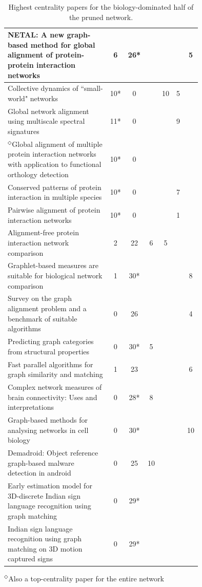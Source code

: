 \documentclass[12pt]{thesis}
\theoremstyle{plain}
\theoremstyle{definition}
\theoremstyle{remark}
\begin{document}
\begin{table}[H]
{\begin{tabular}{|L{0.75\linewidth}|c|c|c|c|c|c|}
NETAL: A new graph-based method for global alignment of protein-protein interaction networks  \cite{Neyshabur_2013} & 6 & 26* &  &  &  & 5 \\ \hline
Collective dynamics of ``small-world" networks  \cite{Watts_1998} & 10* & 0 &  & 10 & 5 &  \\ \hline
Global network alignment using multiscale spectral signatures  \cite{Patro_2012} & 11* & 0 &  &  & 9 &  \\ \hline
$^\Diamond$Global alignment of multiple protein interaction networks with application to functional orthology detection  \cite{Singh_2008} & 10* & 0 &  &  &  &  \\ \hline
Conserved patterns of protein interaction in multiple species  \cite{Sharan_2005} & 10* & 0 &  &  & 7 &  \\ \hline
Pairwise alignment of protein interaction networks  \cite{Koyuturk_2006} & 10* & 0 &  &  & 1 &  \\ \hline
Alignment-free protein interaction network comparison  \cite{Ali_2014} & 2 & 22 & 6 & 5 &  &  \\ \hline
Graphlet-based measures are suitable for biological network comparison  \cite{Hayes_2013} & 1 & 30* &  &  &  & 8 \\ \hline
Survey on the graph alignment problem and a benchmark of suitable algorithms  \cite{Dopmann_2013} & 0 & 26 &  &  &  & 4 \\ \hline
Predicting graph categories from structural properties  \cite{Canning_2018} & 0 & 30* & 5 &  &  &  \\ \hline
Fast parallel algorithms for graph similarity and matching  \cite{Kollias_2014} & 1 & 23 &  &  &  & 6 \\ \hline
Complex network measures of brain connectivity: Uses and interpretations  \cite{Rubinov_2010} & 0 & 28* & 8 &  &  &  \\ \hline
Graph-based methods for analysing networks in cell biology  \cite{Aittokallio_2006} & 0 & 30* &  &  &  & 10 \\ \hline
Demadroid: Object reference graph-based malware detection in android  \cite{Wang_2018} & 0 & 25 & 10 &  &  &  \\ \hline
Early estimation model for 3D-discrete Indian sign language recognition using graph matching  \cite{Kumar_2018a} & 0 & 29* &  &  &  &  \\ \hline
Indian sign language recognition using graph matching on 3D motion captured signs  \cite{Kumar_2018b} & 0 & 29* &  &  &  &  \\ \hline
\end{tabular}

\vspace{-.01cm}
$^\Diamond$Also a top-centrality paper for the entire network}
\vspace{-.22cm}
\centering
\caption{Highest centrality papers for the biology-dominated half of the pruned network.}
\label{tab:toppapers_bio}
\end{table}
\end{document}
